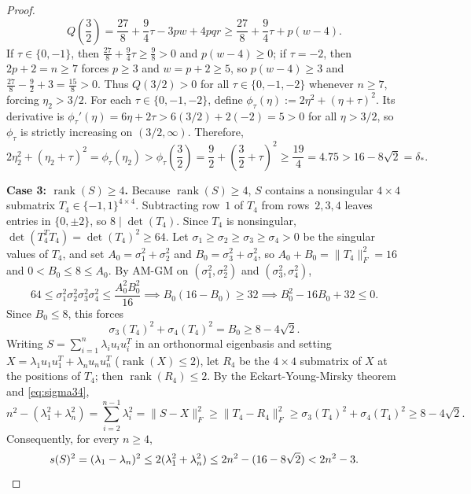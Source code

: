 \documentclass[11pt,reqno]{article}
\theoremstyle{definition}
\newcommand{\rank}{\operatorname{rank}}
\begin{document}
\begin{proof}
\[
Q\!\left(\frac{3}{2}\right) = \frac{27}{8} + \frac{9}{4}\tau - 3pw + 4pqr \ge \frac{27}{8} + \frac{9}{4}\tau + p(w - 4).
\]
If $\tau \in \{0, -1\}$, then $\frac{27}{8} + \frac{9}{4}\tau \ge \frac{9}{8} > 0$ and $p(w-4) \ge 0$; if $\tau = -2$, then $2p + 2 = n \ge 7$ forces $p \ge 3$ and $w = p + 2 \ge 5$, so $p(w - 4) \ge 3$ and $\frac{27}{8} - \frac{9}{2} + 3 = \frac{15}{8} > 0$. Thus $Q(3/2) > 0$ for all $\tau \in \{0, -1, -2\}$ whenever $n \ge 7$, forcing $\eta_2 > 3/2$. For each $\tau \in \{0, -1, -2\}$, define $\phi_\tau(\eta) := 2\eta^2 + (\eta + \tau)^2$. Its derivative is $\phi_\tau'(\eta) = 6\eta + 2\tau > 6(3/2) + 2(-2) = 5 > 0$ for all $\eta > 3/2$, so $\phi_\tau$ is strictly increasing on $(3/2, \infty)$. Therefore,
\[
2\eta_2^2 + (\eta_2 + \tau)^2 = \phi_\tau(\eta_2) > \phi_\tau\left(\frac{3}{2}\right) = \frac{9}{2} + \left(\frac{3}{2} + \tau\right)^2 \ge \frac{19}{4} = 4.75 > 16 - 8\sqrt{2} = \delta_*.
\]

\medskip\noindent\textbf{Case 3: $\rank(S) \ge 4$.}
Because $\rank(S) \ge 4$, $S$ contains a nonsingular $4 \times 4$ submatrix $T_4 \in \{-1, 1\}^{4 \times 4}$. Subtracting row~$1$ of $T_4$ from rows~$2, 3, 4$ leaves entries in $\{0, \pm 2\}$, so $8 \mid \det(T_4)$. Since $T_4$ is nonsingular, $\det(T_4^T T_4) = \det(T_4)^2 \ge 64$. Let $\sigma_1 \ge \sigma_2 \ge \sigma_3 \ge \sigma_4 > 0$ be the singular values of $T_4$, and set $A_0 = \sigma_1^2 + \sigma_2^2$ and $B_0 = \sigma_3^2 + \sigma_4^2$, so $A_0 + B_0 = \|T_4\|_F^2 = 16$ and $0 < B_0 \le 8 \le A_0$. By AM-GM on $(\sigma_1^2, \sigma_2^2)$ and $(\sigma_3^2, \sigma_4^2)$,
\[
64 \le \sigma_1^2 \sigma_2^2 \sigma_3^2 \sigma_4^2 \le \frac{A_0^2 B_0^2}{16}
\implies B_0(16 - B_0) \ge 32
\implies B_0^2 - 16 B_0 + 32 \le 0.
\]
Since $B_0 \le 8$, this forces
\begin{equation}\label{eq:sigma34}
\sigma_3(T_4)^2 + \sigma_4(T_4)^2 = B_0 \ge 8 - 4\sqrt{2}.
\end{equation}
Writing $S = \sum_{i=1}^n \lambda_i u_i u_i^T$ in an orthonormal eigenbasis and setting $X = \lambda_1 u_1 u_1^T + \lambda_n u_n u_n^T$ ($\rank(X) \le 2$), let $R_4$ be the $4 \times 4$ submatrix of $X$ at the positions of $T_4$; then $\rank(R_4) \le 2$. By the Eckart-Young-Mirsky theorem and \eqref{eq:sigma34},
\[
n^2 - (\lambda_1^2 + \lambda_n^2) = \sum_{i=2}^{n-1} \lambda_i^2 = \|S - X\|_F^2 \ge \|T_4 - R_4\|_F^2 \ge \sigma_3(T_4)^2 + \sigma_4(T_4)^2 \ge 8 - 4\sqrt{2}.
\]
Consequently, for every $n \ge 4$,
\[
s(S)^2 = (\lambda_1 - \lambda_n)^2 \le 2(\lambda_1^2 + \lambda_n^2) \le 2n^2 - (16 - 8\sqrt{2}) < 2n^2 - 3. \qedhere
\]
\end{proof}
\end{document}
